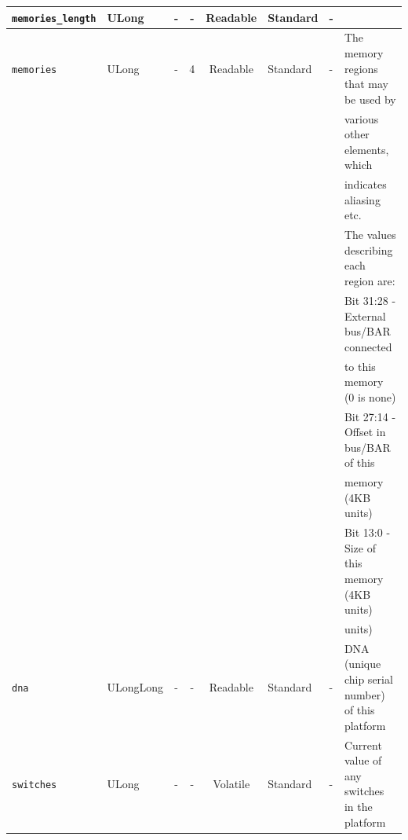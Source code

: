 \documentclass{article}
\begin{document}
\begin{landscape}
\begin{scriptsize}
\begin{tabular}{|p{3cm}|p{1.5cm}|c|c|c|p{1.5cm}|p{1cm}|p{6cm}|}
			\verb+memories_length+ & ULong & -           & -               & Readable           & Standard    & -       &                                                                               \\
			\hline
			\verb+memories+    & ULong  & -              & 4               & Readable           & Standard    & -       & The memory regions that may be used by \\
  	                     &        &                &                 &                    &             &         & various other elements, which          \\
  	                     &        &                &                 &                    &             &         & indicates aliasing etc.               \\
                         &        &                &                 &                    &             &         & The values describing each region are: \\
                         &        &                &                 &                    &             &         & Bit 31:28 - External bus/BAR connected \\
                         &        &                &                 &                    &             &         &             to this memory (0 is none) \\
                         &        &                &                 &                    &             &         & Bit 27:14 - Offset in bus/BAR of this  \\
                         &        &                &                 &                    &             &         &             memory (4KB units)         \\
                         &        &                &                 &                    &             &         & Bit  13:0 - Size of this memory (4KB units) \\
                         &        &                &                 &                    &             &         &             units) \\
			\hline
			\verb+dna+         & ULongLong & -           & -               & Readable           & Standard    & -       & DNA (unique chip serial number) of this platform \\
			\hline
			\verb+switches+    & ULong  & -              & -               & Volatile           & Standard    & -       & Current value of any switches in the platform                                 \\

\end{tabular}
\end{scriptsize}
\end{landscape}
\end{document}
